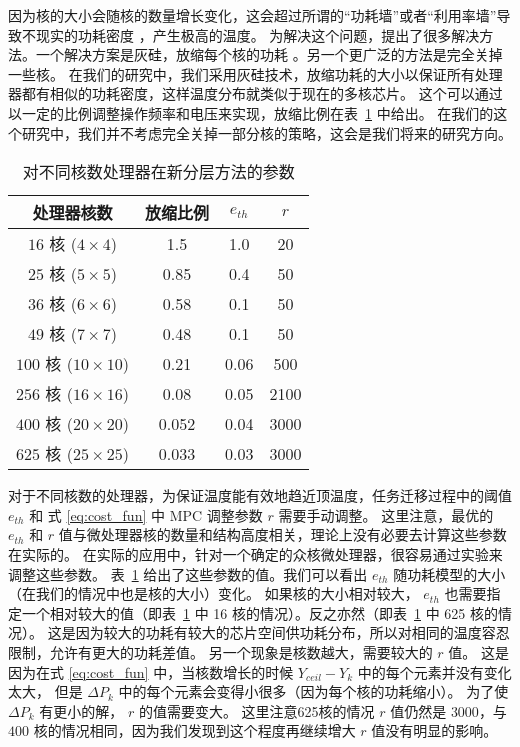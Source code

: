 因为核的大小会随核的数量增长变化，这会超过所谓的“功耗墙”或者“利用率墙”导致不现实的功耗密度   ，产生极高的温度。
为解决这个问题，提出了很多解决方法。一个解决方案是灰硅，放缩每个核的功耗  。另一个更广泛的方法是完全关掉一些核。
在我们的研究中，我们采用灰硅技术，放缩功耗的大小以保证所有处理器都有相似的功耗密度，这样温度分布就类似于现在的多核芯片。
这个可以通过以一定的比例调整操作频率和电压来实现，放缩比例在表~\ref{tab:param} 中给出。
在我们的这个研究中，我们并不考虑完全关掉一部分核的策略，这会是我们将来的研究方向。
\begin{table}[H]
\centering
\caption{对不同核数处理器在新分层方法的参数}\label{tab:param}{
 \begin{tabular}{|c|c|c|c|}
 \hline
 \hline
 处理器核数 &  放缩比例 & $e_{th}$ & $r$ \\
 \hline 
 \hline
 $16$ 核 ($4 \times 4$) & 1.5 & 1.0 & 20 \\
 \hline
 $25$ 核 ($5 \times 5$) & 0.85 & 0.4 & 50 \\
 \hline
 $36$ 核 ($6 \times 6$) & 0.58 & 0.1 & 50 \\
 \hline
 $49$ 核 ($7 \times 7$) & 0.48 & 0.1 & 50 \\
 \hline
 $100$ 核 ($10 \times 10$) & 0.21 & 0.06 & 500  \\
 \hline
 $256$ 核 ($16 \times 16$) & 0.08 & 0.05 & 2100 \\
 \hline
 $400$ 核 ($20 \times 20$) & 0.052 & 0.04 & 3000 \\
 \hline
 $625$ 核 ($25 \times 25$) & 0.033 & 0.03 & 3000 \\
 \hline
 \hline
 \end{tabular}
 }
 \end{table}
 
对于不同核数的处理器，为保证温度能有效地趋近顶温度，任务迁移过程中的阈值 $e_{th}$ 和 式 \eqref{eq:cost_fun} 中 MPC 调整参数 $r$ 需要手动调整。
这里注意，最优的 $e_{th}$ 和 $r$ 值与微处理器核的数量和结构高度相关，理论上没有必要去计算这些参数在实际的。
在实际的应用中，针对一个确定的众核微处理器，很容易通过实验来调整这些参数。
表~\ref{tab:param} 给出了这些参数的值。我们可以看出 $e_{th}$ 随功耗模型的大小（在我们的情况中也是核的大小）变化。
如果核的大小相对较大， $e_{th}$ 也需要指定一个相对较大的值（即表~\ref{tab:param} 中 16 核的情况）。反之亦然（即表~\ref{tab:param} 中 625 核的情况）。
这是因为较大的功耗有较大的芯片空间供功耗分布，所以对相同的温度容忍限制，允许有更大的功耗差值。
另一个现象是核数越大，需要较大的 $r$ 值。
这是因为在式 \eqref{eq:cost_fun} 中，当核数增长的时候 $Y_{ceil}-Y_k$ 中的每个元素并没有变化太大，
但是 $\Delta P_k$ 中的每个元素会变得小很多（因为每个核的功耗缩小）。
为了使 $\Delta P_k$ 有更小的解， $r$ 的值需要变大。
这里注意625核的情况 $r$ 值仍然是 $3000$，与 $400$ 核的情况相同，因为我们发现到这个程度再继续增大 $r$ 值没有明显的影响。

